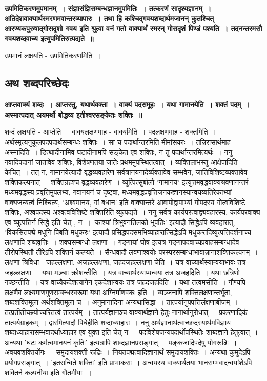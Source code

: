 	{\bfseries उपमितिकरणमुपमानम्~। संज्ञासंज्ञिसम्बन्धज्ञानमुपमितिः~। तत्करणं सादृश्यज्ञानम्~। अतिदेशवाक्यार्थस्मरणमवान्तरव्यापारः~। तथा हि कश्चिद्गवयशब्दार्थमजानन् कुतश्चित् आरण्यकपुरुषाद्गोसदृशो गवय इति श्रुत्वा वनं गतो वाक्यार्थं स्मरन् गोसदृशं पिण्डं पश्यति~। तदनन्तरमसौ गवयशब्दवाच्य इत्युपमितिरुत्पद्यते~॥}\par
		उपमानं लक्षयति - उपमितिकरणमिति~। \subsection*{अथ शब्दपरिच्छेदः}
	{\bfseries आप्तवाक्यं शब्दः~। आप्तस्तु, यथार्थवक्ता~। वाक्यं पदसमूहः~। यथा गामानयेति~। शक्तं पदम्~। अस्मात्पदात् अयमर्थो बोद्धव्य इतीश्वरसङ्केतः शक्तिः~॥}\par
		शब्दं लक्षयति - आप्तेति~। वाक्यलक्षणमाह - वाक्यमिति~। पदलक्षणमाह - शक्तमिति~। अर्थस्मृत्यनुकूलपदपदार्थसम्बन्धः शक्तिः~। सा च पदार्थान्तरमिति मीमांसकाः~। तन्निरासार्थमाह - अस्मादिति~। डित्थादीनामिव घटादीनामपि सङ्केत एव शक्तिः, न तु पदार्थान्तरमित्यर्थः~। ननु गवादिपदानां जातावेव शक्तिः, विशेषणतया जातेः प्रथममुपस्थितत्वात्~। व्यक्तिलाभस्तु आक्षेपादिति केचित्~। तत् न, गामानयेत्यादौ वृद्धव्यवहारेण सर्वत्रानयनादेर्व्यक्तावेव सम्भवेन, जातिविशिष्टव्यक्तावेव शक्तिकल्पनात्~। शक्तिग्रहश्च वृद्धव्यवहारेण~। व्युत्पित्सुर्बालो ’गामानय’ इत्युत्तमवृद्धवाक्यश्रवणानन्तरं मध्यमवृद्धस्य प्रवृत्तिमुपलभ्य, गवानयनं च दृष्ट्वा, मध्यमवृद्धप्रवृत्तिजनकज्ञानस्यान्वयव्यतिरेकाभ्यां वाक्यजन्यत्वं निश्चित्य, ’अश्वमानय, गां बधान’ इति वाक्यान्तरे आवापोद्वापाभ्यां गोपदस्य गोत्वविशिष्टे शक्तिः, अश्वपदस्य अश्वत्वविशिष्टे शक्तिरिति व्युत्पद्यते~। ननु सर्वत्र कार्यपरत्वाद्व्यवहारस्य, कार्यपरवाक्य एव व्युत्पत्तिर्न सिद्धे इति चेत् , न~। ’काश्यां त्रिभुवनतिलको भूपतिः’ इत्यादौ सिद्धेऽपि व्यवहारात्, ’विकसितपद्मे मधूनि पिबति मधुकरः’ इत्यादौ प्रसिद्धपदसमभिव्याहारात्सिद्धेऽपि मधुकरादिव्युत्पत्तिदर्शनाच्च~। लक्षणापि शब्दवृत्तिः~। शक्यसम्बन्धो लक्षणा~। गङ्गायां घोष इत्यत्र गङ्गापदवाच्यप्रवाहसम्बन्धादेव तीरोपस्थितौ तीरेऽपि शक्तिर्न कल्प्यते~। सैन्धवादौ लवणाश्वयोः परस्परसम्बन्धाभावान्नानाशक्तिकल्पनम्~। लक्षणा त्रिविधा - जहल्लक्षणा, अजहल्लक्षणा, जहदजहल्लक्षणा चेति~। यत्र वाच्यार्थस्यान्वयाभावः तत्र जहल्लक्षणा~। यथा मञ्चाः क्रोशन्तीति~। यत्र वाच्यार्थस्याप्यन्वयः तत्र अजहदिति~। यथा छत्रिणो गच्छन्तीति~। यत्र वाच्यैकदेशत्यागेन एकदेशान्वयः तत्र जहदजहदिति~। यथा तत्वमसीति~। गौण्यपि लक्षणैव लक्ष्यमाणगुणसम्बन्धस्वरूपा यथा अग्निर्माणवकः इति~। व्यञ्जनापि शक्तिलक्षणान्तर्भूता, शब्दशक्तिमूला अर्थशक्तिमूला च~। अनुमानादिना अन्यथासिद्धा~। तात्पर्यानुपपत्तिर्लक्षणाबीजम्~। तत्प्रतीतीच्छयोच्चरितत्वं तात्पर्यम्~। तात्पर्यज्ञानञ्च वाक्यार्थज्ञाने हेतुः नानार्थानुरोधात्~। प्रकरणादिकं तात्पर्यग्राहकम्~। द्वारमित्यादौ पिधेहीति शब्दाध्याहारः~। ननु अर्थज्ञानार्थत्वाच्छब्दस्यार्थमविज्ञाय शब्दाध्याहारासम्भवादर्थाध्याहार एव युक्त इति चेत् न~। पदविशेषजन्यपदार्थोपस्थितेः शाब्दज्ञाने हेतुत्वात्~। अन्यथा ’घटः कर्मत्वमानयनं कृतिः’ इत्यत्रापि शाब्दज्ञानप्रसङ्गात्~। पङ्कजादिपदेषु योगरूढिः~। अवयवशक्तिर्योगः~। समुदायशक्ती रूढिः~। नियतपद्मत्वादिज्ञानार्थं समुदायशक्तिः~। अन्यथा कुमुदेऽपि प्रयोगप्रसङ्गात्~। ’इतरान्विते शक्तिः’ इति प्राभाकराः~। अन्वयस्य वाक्यार्थतया भानसम्भवादन्वयांशेऽपि शक्तिर्न कल्पनीया इति गौतमीयाः~।\\[10pt]
